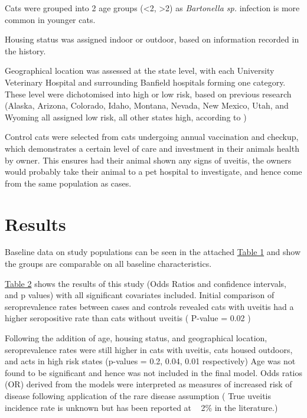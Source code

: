 \documentclass[11pt,twocolumn]{article}
\begin{document}
		Cats were grouped into 2 age groups (\textless 2, \textgreater 2) as \emph{Bartonella sp.} infection is more common in younger cats.


		Housing status was assigned indoor or outdoor, based on information recorded in the history.


		Geographical location was assessed at the state level, with each University Veterinary Hospital and surrounding Banfield hospitals forming one category.
		These level were dichotomised into high or low risk, based on previous research (Alaska, Arizona, Colorado, Idaho, Montana, Nevada, New Mexico, Utah, and Wyoming all assigned low risk, all other states high, according to \cite{Jameson1995a})


		Control cats were selected from cats undergoing annual vaccination and checkup, which demonstrates a certain level of care and investment in their animals health by owner. This ensures had their animal shown any signs of uveitis, the owners would probably take their animal to a pet hospital to investigate, and hence come from the same population as cases.


\section{Results}


		Baseline data on study populations can be seen in the attached \hyperref[tab:1]{Table 1} and show the groups are comparable on all baseline characteristics.


		\hyperref[tab:2]{Table 2} shows the results of this study (Odds Ratios and confidence intervals, and p values) with all significant covariates included.
		Initial comparison of seroprevalence rates between cases and controls revealed cats with uveitis had a higher seropositive rate than cats without uveitis ( P-value = 0.02 ) 


		Following the addition of age, housing status, and geographical location, seroprevalence rates were still higher in cats with uveitis, cats housed outdoors, and acts in high risk states (p-values = 0.2, 0.04, 0.01 respectively)
		Age was not found to be significant and hence was not included in the final model.
		Odds ratios (OR) derived from the models were interpreted as measures of increased risk of disease following application of the rare disease assumption ( True uveitis incidence rate is unknown but has been reported at ~ 2\% in the literature.)
\end{document}
